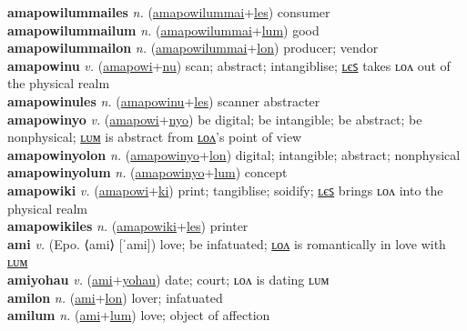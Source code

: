 \textbf{amapowilummailes} \textit{n.} (\hyperref[amapowilummai]{amapowilummai}+\hyperref[les]{les})
consumer \label{amapowilummailes} \\
\textbf{amapowilummailum} \textit{n.} (\hyperref[amapowilummai]{amapowilummai}+\hyperref[lum]{lum})
good \label{amapowilummailum} \\
\textbf{amapowilummailon} \textit{n.} (\hyperref[amapowilummai]{amapowilummai}+\hyperref[lon]{lon})
producer; vendor \label{amapowilummailon} \\
\textbf{amapowinu} \textit{v.} (\hyperref[amapowi]{amapowi}+\hyperref[nu]{nu})
scan; abstract; intangiblise; \hyperref[amapowinules]{ʟєꜱ} takes ʟᴏᴧ out of the physical realm \label{amapowinu} \\
\textbf{amapowinules} \textit{n.} (\hyperref[amapowinu]{amapowinu}+\hyperref[les]{les})
scanner abstracter \label{amapowinules} \\
\textbf{amapowinyo} \textit{v.} (\hyperref[amapowi]{amapowi}+\hyperref[nyo]{nyo})
be digital; be intangible; be abstract; be nonphysical; \hyperref[amapowinyolum]{ʟᴜᴍ} is abstract from \hyperref[amapowinyolon]{ʟᴏᴧ}'s point of view \label{amapowinyo} \\
\textbf{amapowinyolon} \textit{n.} (\hyperref[amapowinyo]{amapowinyo}+\hyperref[lon]{lon})
digital; intangible; abstract; nonphysical \label{amapowinyolon} \\
\textbf{amapowinyolum} \textit{n.} (\hyperref[amapowinyo]{amapowinyo}+\hyperref[lum]{lum})
concept \label{amapowinyolum} \\
\textbf{amapowiki} \textit{v.} (\hyperref[amapowi]{amapowi}+\hyperref[ki]{ki})
print; tangiblise; soidify; \hyperref[amapowikiles]{ʟєꜱ} brings ʟᴏᴧ into the physical realm \label{amapowiki} \\
\textbf{amapowikiles} \textit{n.} (\hyperref[amapowiki]{amapowiki}+\hyperref[les]{les})
printer \label{amapowikiles} \\
\textbf{ami} \textit{v.} (Epo. ⟨ami⟩ [ˈami])
love; be infatuated; \hyperref[amilon]{ʟᴏᴧ} is romantically in love with \hyperref[amilum]{ʟᴜᴍ} \label{ami} \\
\textbf{amiyohau} \textit{v.} (\hyperref[ami]{ami}+\hyperref[yohau]{yohau})
date; court; ʟᴏᴧ is dating ʟᴜᴍ \label{amiyohau} \\
\textbf{amilon} \textit{n.} (\hyperref[ami]{ami}+\hyperref[lon]{lon})
lover; infatuated \label{amilon} \\
\textbf{amilum} \textit{n.} (\hyperref[ami]{ami}+\hyperref[lum]{lum})
love; object of affection \label{amilum} \\
